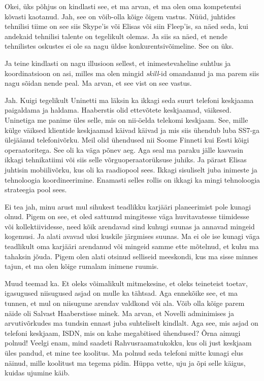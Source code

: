 Okei, üks põhjus on kindlasti see, et ma arvan, et ma olen oma kompetentsi 
kõvasti kaotanud. Jah, see on võib-olla kõige õigem vastus. Nüüd, juhtides 
tehnilisi tiime on see siis Skype'is või Elisas või siin Fleep'is, sa näed 
seda, kui andekaid tehnilisi talente on tegelikult olemas. Ja siis sa näed, et  
nende tehnilistes oskustes ei ole sa nagu üldse konkurentsivõimeline. See on 
üks.


Ja teine kindlasti on nagu illusioon sellest, et  inimestevaheline suhtlus ja 
koordinatsioon on asi, milles ma olen mingid \emph{skill}-id omandanud ja ma 
parem siis nagu sõidan nende peal. Ma arvan, et see vist on see vastus. 


Jah. Kuigi tegelikult Uninetti  ma läksin ka ikkagi seda suurt telefoni 
keskjaama paigaldama ja haldama. Haaberstis olid  ettevõtete keskjaamad, 
väikesed. Uninetiga me panime üles selle, mis on nii-öelda telekomi keskjaam. 
See, mille külge  väiksed klientide keskjaamad käivad käivad ja mis siis 
ühendub luba SS7-ga ülejäänud telefonivõrku. Meil olid ühendused nii Soome 
Finneti  kui Eesti kõigi operaatoritega. See oli ka väga põnev aeg. Aga seal ma 
paraku jälle kasvasin  ikkagi tehnikatiimi või siis selle võrguoperaatorüksuse 
juhiks. Ja pärast Elisas juhtisin mobiilivõrku, kus oli ka raadiopool sees. 
Ikkagi sisuliselt juba inimeste ja tehnoloogia koordineerimine. Enamasti selles 
rollis on ikkagi ka mingi tehnoloogia strateegia pool sees. 


Ei tea jah, minu arust mul sihukest teadlikku karjääri planeerimist pole kunagi 
olnud. Pigem on see, et oled sattunud mingitesse väga huvitavatesse tiimidesse 
või kollektiividesse, need kõik arendavad sind kuhugi suunas ja annavad  
mingeid kogemusi. Ja alati avavad uksi kuskile järgmises suunas. Ma ei ole ise 
kunagi  väga teadlikult oma karjääri arendanud või mingeid samme ette mõtelnud, 
et kuhu ma tahaksin jõuda. Pigem olen alati otsinud selliseid meeskondi, kus ma 
sisse minnes tajun, et ma olen kõige rumalam inimene ruumis. 


Muud teemad ka. Et oleks võimalikult mitmekesine, et oleks teineteist toetav, 
igasugused niisugused asjad on mulle ka tähtsad. Aga ennekõike see, et ma 
tunnen, et mul on niisugune arendav valdkond või ala. Võib olla kõige parem 
näide oli Salvast Haaberstisse minek. Ma arvan, et Novelli adminimises ja 
arvutivõrkudes ma tundsin ennast juba suhteliselt kindlalt. Aga see, mis asjad 
on telefoni keskjaam, ISDN, mis on kahe megabitised ühendused? Õrna aimugi 
polnud! Veelgi enam, mind saadeti Rahvusraamatukokku, kus oli just keskjaam 
üles pandud, et mine tee koolitus. Ma polnud seda telefoni mitte kunagi elus 
näinud, mille koolitust ma tegema pidin. Hüppa vette, uju ja õpi selle käigus, 
 kuidas ujumine käib. 

